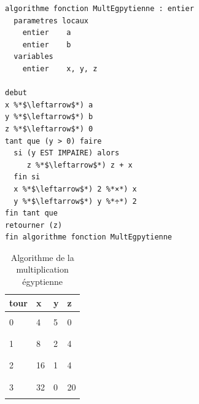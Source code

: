 \documentclass[11pt,a4paper]{article}
\begin{document}
\begin{table}[h!]
  \centering
  \begin{minipage}{0.59\textwidth}
    \centering
\begin{lstlisting}[style=algorithmique]
algorithme fonction MultEgpytienne : entier
  parametres locaux
    entier    a
    entier    b
  variables
    entier    x, y, z

debut
x %*$\leftarrow$*) a
y %*$\leftarrow$*) b
z %*$\leftarrow$*) 0
tant que (y > 0) faire
  si (y EST IMPAIRE) alors
     z %*$\leftarrow$*) z + x
  fin si
  x %*$\leftarrow$*) 2 %*×*) x
  y %*$\leftarrow$*) y %*÷*) 2
fin tant que
retourner (z)
fin algorithme fonction MultEgpytienne \end{lstlisting}
  \end{minipage}
  \hfillx
  \begin{minipage}{0.4\textwidth}
    \centering
    \begin{tabular}{|C{1cm}|C{1cm}|C{1cm}|C{1cm}|}
        \hline
        tour &  x &  y &  z  \\
        \hline
             &    &    &   \\
        0    &  4 &  5 &  0 \\
             &    &    &   \\
        \hline
             &    &    &   \\
        1    &  8 &  2 &  4 \\
             &    &    &   \\
        \hline
             &    &    &   \\
        2    & 16 &  1 &  4 \\
             &    &    &   \\
        \hline
             &    &    &   \\
        3    & 32 &  0 & 20 \\
             &    &    &   \\
        \hline
    \end{tabular}
  \end{minipage}
  \caption{Algorithme de la multiplication égyptienne}
  \label{multiplication-egyptienne}
\end{table}
\end{document}
